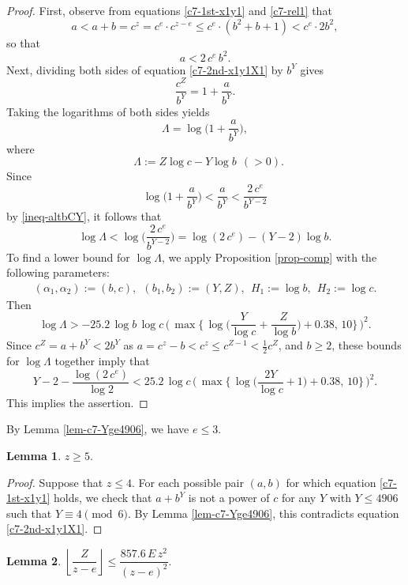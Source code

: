 \documentclass[11pt]{amsart}
\newtheorem{lem}{Lemma}[section]
\numberwithin{equation}{section}
\begin{document}
\begin{proof}%
First, observe from equations \eqref{c7-1st-x1y1} and \eqref{c7-rel1} that
\[
a<a+b=c^z=c^e \cdot c^{z-e} \le c^e \cdot (b^2+b+1)<c^e \cdot 2b^2,
\]
so that
\begin{equation}\label{ineq-altbCY}
a<2\,c^e\,b^2.
\end{equation}
Next, dividing both sides of equation \eqref{c7-2nd-x1y1X1} by $b^Y$ gives
\[
\frac{c^Z}{b^Y}=1+\frac{a}{b^Y}.
\]
Taking the logarithms of both sides yields
\[
\varLambda=\log\biggr(1+\frac{a}{b^Y}\biggr),%
\]
where 
\[
\ \ \ \varLambda:=Z \log c - Y \log b \ \ (>0).
\]
Since
\[
\log\biggr(1+\frac{a}{b^Y}\biggr)<\frac{a}{b^Y}<\frac{2\,c^e}{b^{Y-2}}
\]
by \eqref{ineq-altbCY}, it follows that
\[
\log \varLambda < \log\biggr(\frac{2\,c^e}{b^{Y-2}}\biggr) = \log (2\,c^e) - (Y-2)\log b.
\]
To find a lower bound for $\log \varLambda$, we apply Proposition \ref{prop-comp} with the following parameters:
\begin{gather*}
(\alpha_1,\alpha_2):=(b,c), \ \ (b_1,b_2):=(Y,Z), \ \ H_1:=\log b, \ \ H_2:=\log c.
\end{gather*}
Then
\[
\log \varLambda > -25.2 \,\log b\,\log c\, \biggl(\,\max \biggl \{ \,\log \Bigr( \frac{Y}{\log c}+\frac{Z}{\log b} \Bigr) +0.38, \,10\biggl\} \,\biggl)^2.
\]
Since $c^Z=a+b^Y<2b^Y$ as $a=c^z-b<c^z \le c^{Z-1}<\frac{1}{2}c^Z$, and $b \ge 2$, these bounds for $\log \varLambda$ together imply that
\[
Y-2- \frac{\log (2\,c^e)}{\log 2} <25.2\,\log c\,\biggl(\,\max \biggl \{\,\log \Bigr( \frac{2Y}{\log c}+1 \Bigr) +0.38, \,10\biggl\} \,\biggl)^2.
\]
This implies the assertion.
\end{proof}

By Lemma \ref{lem-c7-Yge4906}, we have $e \le 3$.

\begin{lem}\label{lem-c7-zge5}
$z \ge 5.$
\end{lem}

\begin{proof}
Suppose that $z \le 4$.
For each possible pair $(a,b)$ for which equation \eqref{c7-1st-x1y1} holds, we check that $a+b^Y$ is not a power of $c$ for any $Y$ with $Y \le 4906$ such that $Y \equiv 4 \pmod{6}$. 
By Lemma \ref{lem-c7-Yge4906}, this contradicts equation \eqref{c7-2nd-x1y1X1}.
\end{proof}

\begin{lem}\label{c7-lem-ub-Z/z}
$\left\lfloor \dfrac{Z}{z-e} \right\rfloor \le \dfrac{857.6\,E\,z^2}{(z-e)^2}.$
\end{lem}
\end{document}
